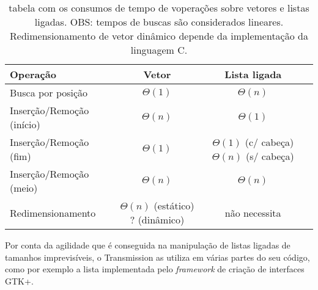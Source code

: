 \begin{table}
    \centering
    \begin{tabular}{| l | c | c | c |}
        \hline
        \textbf{Operação} & \textbf{Vetor} & \textbf{Lista ligada} \\
        \hline
        Busca por posição & $\Theta(1)$ & $\Theta(n)$ \\
        \hline
        Inserção/Remoção (início) & $\Theta(n)$ & $\Theta(1)$ \\
        \hline
        Inserção/Remoção (fim) & $\Theta(1)$ & \parbox[t]{.3\textwidth}{\centering $\Theta(1)$ (c/ cabeça) \\ $\Theta(n)$ (s/ cabeça)} \\
        \hline
        Inserção/Remoção (meio) & $\Theta(n)$ & $\Theta(n)$ \\
        \hline
        Redimensionamento & \parbox[t]{.25\textwidth}{\centering $\Theta(n)$ (estático) \\ ? (dinâmico)} & não necessita \\
        \hline
    \end{tabular}
    \caption{tabela com os consumos de tempo de voperações sobre vetores e listas
    ligadas. OBS: tempos de buscas são considerados lineares. Redimensionamento de vetor
    dinâmico depende da implementação da linguagem C.}
\end{table}

Por conta da agilidade que é conseguida na manipulação de listas ligadas de tamanhos
imprevisíveis, o Transmission as utiliza em várias partes do seu código, como por
exemplo a lista implementada pelo \emph{framework} de criação de interfaces GTK+.